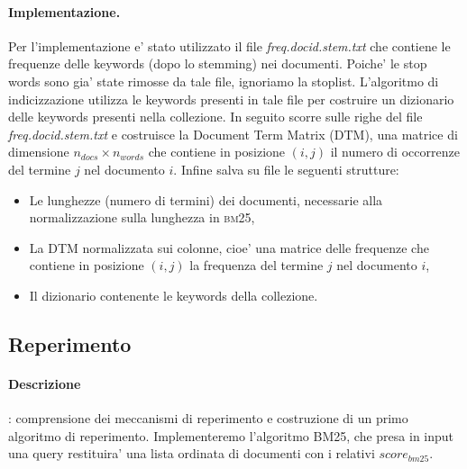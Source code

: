 \paragraph{\textbf{Implementazione.}}
Per l'implementazione e' stato utilizzato il file \textit{freq.docid.stem.txt} che contiene le frequenze delle keywords (dopo lo stemming) nei documenti. Poiche' le stop words sono gia' state rimosse da tale file, ignoriamo la stoplist.
L'algoritmo di indicizzazione utilizza le keywords presenti in tale file per costruire un dizionario delle keywords presenti nella collezione. In seguito scorre sulle righe del file \textit{freq.docid.stem.txt} e costruisce la Document Term Matrix (DTM), una matrice di  dimensione $n_{docs} \times n_{words}$ che contiene in posizione $(i,j)$ il numero di occorrenze del termine $j$ nel documento $i$. Infine salva su file le seguenti strutture:
\begin{itemize}
	\item Le lunghezze (numero di termini) dei documenti, necessarie alla normalizzazione sulla lunghezza in \textsc{bm25},
	\item La DTM normalizzata sui colonne, cioe' una matrice delle frequenze che contiene in posizione $(i,j)$ la frequenza del termine $j$ nel documento $i$,
	\item Il dizionario contenente le keywords della collezione.
\end{itemize}

\subsection{Reperimento}
\label{sec:metodi-di-reper}

\paragraph{\textbf{Descrizione}}: comprensione dei meccanismi di reperimento e costruzione di un primo algoritmo di reperimento.
Implementeremo l'algoritmo \textsc{BM25}, che presa in input una query restituira' una lista ordinata di documenti con i relativi $score_{bm25}$.

